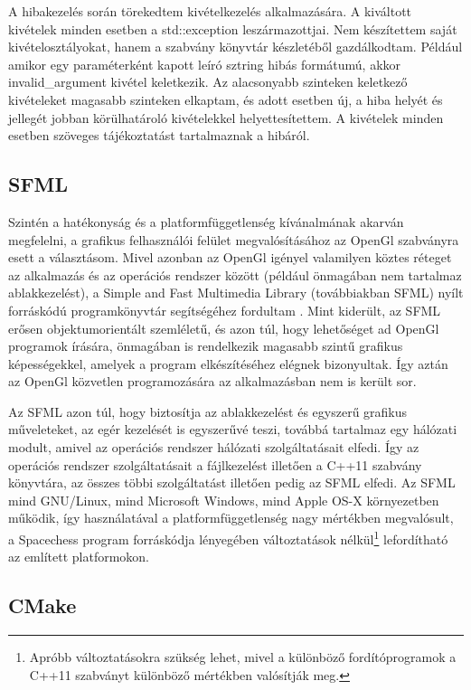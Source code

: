 \documentclass[12pt, twoside]{report}
\begin{document}
A hibakezelés során törekedtem kivételkezelés alkalmazására. A kiváltott kivételek minden esetben a std::exception leszármazottjai. Nem készítettem saját kivételosztályokat, hanem a szabvány könyvtár készletéből gazdálkodtam. Például amikor egy paraméterként kapott leíró sztring hibás formátumú, akkor invalid\_argument kivétel keletkezik. Az alacsonyabb szinteken keletkező kivételeket magasabb szinteken elkaptam, és adott esetben új, a hiba helyét és jellegét jobban körülhatároló kivételekkel helyettesítettem. A kivételek minden esetben szöveges tájékoztatást tartalmaznak a hibáról.

\subsection{SFML}

Szintén a hatékonyság és a platformfüggetlenség kívánalmának akarván megfelelni, a grafikus felhasználói felület megvalósításához az OpenGl szabványra esett a választásom. Mivel azonban az OpenGl igényel valamilyen köztes réteget az alkalmazás és az operációs rendszer között (például önmagában nem tartalmaz ablakkezelést), a Simple and Fast Multimedia Library (továbbiakban SFML) nyílt forráskódú programkönyvtár se\-gít\-sé\-gé\-hez fordultam \cite{sfml}. Mint kiderült, az SFML erősen objektumorientált szemléletű, és azon túl, hogy lehetőséget ad OpenGl programok írására, önmagában is rendelkezik magasabb szintű grafikus képességekkel, amelyek a program elkészítéséhez elégnek bizonyultak. Így aztán az OpenGl közvetlen programozására az alkalmazásban nem is került sor. 

Az SFML azon túl, hogy biztosítja az ablakkezelést és egyszerű grafikus műveleteket, az egér kezelését is egyszerűvé teszi, továbbá tartalmaz egy hálózati modult, amivel az operációs rendszer hálózati szolgáltatásait elfedi. Így az operációs rendszer szolgáltatásait a fájlkezelést illetően a C++11 szabvány könyvtára, az összes többi szolgáltatást illetően pedig az SFML elfedi. Az SFML mind GNU/Linux, mind Microsoft Windows, mind Apple OS-X környezetben működik, így használatával a platformfüggetlenség nagy mértékben megvalósult, a Spacechess program forráskódja lé\-nye\-gé\-ben változtatások nélkül\footnote{Apróbb változtatásokra szükség lehet, mivel a különböző fordítóprogramok a C++11 szabványt különböző mértékben valósítják meg.} lefordítható az említett platformokon. 

\subsection{CMake}
\end{document}
